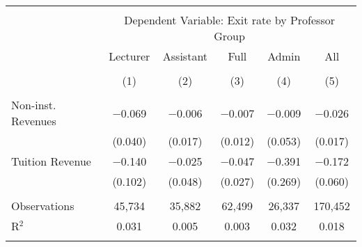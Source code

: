
\begin{tabular}{@{\extracolsep{5pt}}lccccc} 
\\[-1.8ex]\hline 
\hline \\[-1.8ex] 
 & \multicolumn{5}{c}{Dependent Variable: Exit rate by Professor Group} \\ 
\cline{2-6} 
 & Lecturer & Assistant & Full & Admin & All \\ 
\\[-1.8ex] & (1) & (2) & (3) & (4) & (5)\\ 
\hline \\[-1.8ex] 
 Non-inst. Revenues & $-$0.069 & $-$0.006 & $-$0.007 & $-$0.009 & $-$0.026 \\ 
  & (0.040) & (0.017) & (0.012) & (0.053) & (0.017) \\ 
  Tuition Revenue & $-$0.140 & $-$0.025 & $-$0.047 & $-$0.391 & $-$0.172 \\ 
  & (0.102) & (0.048) & (0.027) & (0.269) & (0.060) \\ 
 \hline \\[-1.8ex] 
Observations & 45,734 & 35,882 & 62,499 & 26,337 & 170,452 \\ 
R$^{2}$ & 0.031 & 0.005 & 0.003 & 0.032 & 0.018 \\ 
\hline 
\hline \\[-1.8ex] 
\end{tabular} 
